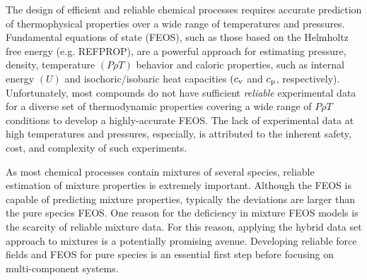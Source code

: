\documentclass[11pt,a4paper]{article}
\begin{document}

The design of efficient and reliable chemical processes requires accurate prediction of thermophysical properties over a wide range of temperatures and pressures. Fundamental equations of state (FEOS), such as those based on the Helmholtz free energy (e.g. REFPROP), are a powerful approach for estimating pressure, density, temperature $(P\rho T)$ behavior and caloric properties, such as internal energy $(U)$ and isochoric/isobaric heat capacities $(c_{\rm v}$ and $c_{\rm p}$, respectively). Unfortunately, most compounds do not have sufficient \textit{reliable} experimental data for a diverse set of thermodynamic properties covering a wide range of $P \rho T$ conditions to develop a highly-accurate FEOS. The lack of experimental data at high temperatures and pressures, especially, is attributed to the inherent safety, cost, and complexity of such experiments. 

As most chemical processes contain mixtures of several species, reliable estimation of mixture properties is extremely important. Although the FEOS is capable of predicting mixture properties, typically the deviations are larger than the pure species FEOS. One reason for the deficiency in mixture FEOS models is the scarcity of reliable mixture data. For this reason, applying the hybrid data set approach to mixtures is a potentially promising avenue. Developing reliable force fields and FEOS for pure species is an essential first step before focusing on multi-component systems.




\end{document}
